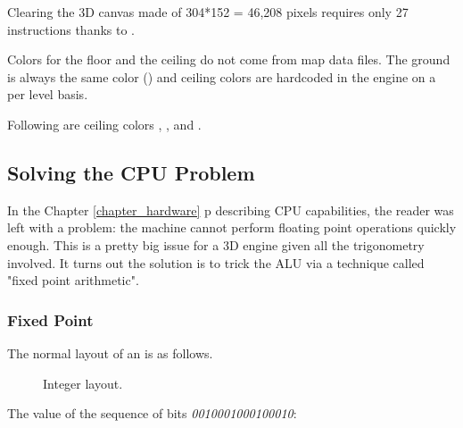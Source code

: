 \begin{minipage}{\textwidth}
 
 \end{minipage}
\par
Clearing the 3D canvas made of 304*152 = 46,208 pixels requires only 27 instructions thanks to .\\
\par
Colors for the floor and the ceiling do not come from map data files. The ground is always the same color () and ceiling colors are hardcoded in the engine on a per level basis.\\
\par
\begin{minipage}{\textwidth}
 
 \end{minipage}
\par


Following are ceiling colors , ,  and .\\ 
\par
{}












\subsection{Solving the CPU Problem}

In the Chapter \ref{chapter_hardware}  p\pageref{chapter_hardware} describing CPU capabilities, the reader was left with a problem: the machine cannot perform floating point operations quickly enough. This is a pretty big issue for a 3D engine given all the trigonometry involved. It turns out the solution is to trick the ALU via a technique called "fixed point arithmetic".







\subsubsection{Fixed Point}
The normal layout of an  is as follows.
\begin{figure}[H]
\centering
 
 \caption{Integer layout.} \label{fig:int_layout}
 \end{figure}
The value of the sequence of bits \emph{0010001000100010}:
\begin{figure}[H]
\centering

 \end{figure}

